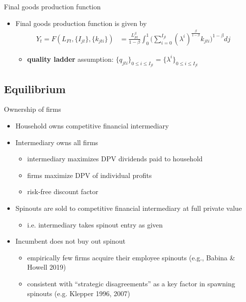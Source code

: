 \documentclass[english,usenames,dvipsnames]{beamer}
\begin{document}
\begin{frame}{Final goods production function}\label{definition:final_goods_production}\hyperlink{main:final_goods_production}{}
	\begin{itemize}
		\item Final goods production function is given by
		\begin{align*}
		Y_t = F(L_{Ft},\{I_{jt}\},\{k_{jti}\}) &= \frac{L_{Ft}^{\beta}}{1-\beta} \int_0^1 \Big(\sum_{i = 0}^{I_{jt}} (\lambda^{i})^{\frac{\beta}{1-\beta}} k_{jti} \Big)^{1-\beta} dj
		\end{align*}
		\begin{itemize}
			\item \alert{\textbf{quality ladder}} assumption: $\{q_{jti}\}_{0 \le i \le I_{jt}} = \{\lambda^i\}_{0 \le i \le I_{jt}}$
		\end{itemize}
	\end{itemize}
\end{frame}


\subsection{Equilibrium}

\begin{frame}{Ownership of firms}\label{model:firm_ownership}
	\hyperlink{definition:equilibrium}{}
	\begin{itemize}
		\item Household owns competitive financial intermediary
		\item Intermediary owns all firms
		\begin{itemize}
			\item intermediary maximizes DPV dividends paid to household
			\item firms maximize DPV of individual profits
			\item risk-free discount factor
		\end{itemize}
		\medskip
		\item Spinouts are sold to competitive financial intermediary at full private value
		\begin{itemize}
			\item i.e. intermediary takes spinout entry as given
		\end{itemize}
		\medskip
		\item Incumbent does not buy out spinout 
		\begin{itemize}
			\item empirically few firms acquire their employee spinouts (e.g., Babina \& Howell 2019)
			\item consistent with ``strategic disagreements'' as a key factor in spawning spinouts (e.g. Klepper 1996, 2007) 
		\end{itemize}
	\end{itemize}
\end{frame}
\end{document}
